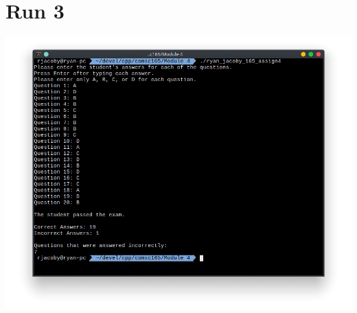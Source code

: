 \documentclass[letterpaper, 11pt]{article}
\begin{document}
\section*{Run 3}
\includegraphics[scale=0.5]{run3.png}
\end{document}
